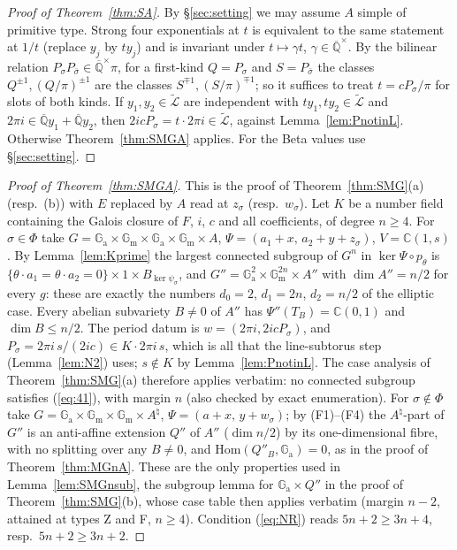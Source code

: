 \documentclass[11pt]{amsart}
\theoremstyle{definition}
\newcommand{\Qb}{\overline{\mathbb{Q}}}
\newcommand{\C}{\mathbb{C}}
\newcommand{\Ga}{\mathbb{G}_{\mathrm a}}
\newcommand{\Gm}{\mathbb{G}_{\mathrm m}}
\newcommand{\Lt}{\widetilde{\mathcal{L}}}
\begin{document}
\begin{proof}[Proof of Theorem~\ref{thm:SA}]
By \S\ref{sec:setting} we may assume $A$ simple of primitive type. Strong four exponentials at $t$ is equivalent to the same
statement at $1/t$ (replace $y_j$ by $ty_j$) and is invariant under $t\mapsto\gamma t$, $\gamma\in\Qb^\times$. By the bilinear
relation $P_\sigma P_{\bar\sigma}\in\Qb^\times\pi$, for a first-kind $Q=P_\sigma$ and $S=P_{\bar\sigma}$ the classes
$Q^{\pm1},(Q/\pi)^{\pm1}$ are the classes $S^{\mp1},(S/\pi)^{\mp1}$; so it suffices to treat $t=cP_\sigma/\pi$ for slots of both
kinds. If $y_1,y_2\in\Lt$ are independent with $ty_1,ty_2\in\Lt$ and $2\pi i\in\Qb y_1+\Qb y_2$, then
$2icP_\sigma=t\cdot2\pi i\in\Lt$, against Lemma~\ref{lem:PnotinL}. Otherwise Theorem~\ref{thm:SMGA} applies. For the Beta
values use \S\ref{sec:setting}.
\end{proof}

\begin{proof}[Proof of Theorem~\ref{thm:SMGA}]
This is the proof of Theorem~\ref{thm:SMG}(a) (resp.\ (b)) with $E$ replaced by $A$ read at $z_\sigma$ (resp.\ $w_\sigma$).
Let $K$ be a number field containing the Galois closure of $F$, $i$, $c$ and all coefficients, of degree $n\ge4$. For
$\sigma\in\Phi$ take $G=\Ga\times\Gm\times\Ga\times\Gm\times A$, $\Psi=(a_1+x,\,a_2+y+z_\sigma)$, $V=\C(1,s)$. By
Lemma~\ref{lem:Kprime} the largest connected subgroup of $G^n$ in $\ker\Psi\circ p_\theta$ is
$\{\theta\cdot a_1=\theta\cdot a_2=0\}\times1\times B_{\ker\psi_\sigma}$, and $G''=\Ga^2\times\Gm^{2n}\times A''$ with
$\dim A''=n/2$ for every $g$: these are exactly the numbers $d_0=2$, $d_1=2n$, $d_2=n/2$ of the elliptic case. Every abelian
subvariety $B\neq0$ of $A''$ has $\Psi''(T_B)=\C(0,1)$ and $\dim B\le n/2$. The period datum is $w=(2\pi i,2icP_\sigma)$, and
$P_\sigma=2\pi i\,s/(2ic)\in K\cdot2\pi i\,s$, which is all that the line-subtorus step (Lemma~\ref{lem:N2}) uses;
$s\notin K$ by Lemma~\ref{lem:PnotinL}. The case analysis of Theorem~\ref{thm:SMG}(a) therefore applies verbatim: no
connected subgroup satisfies (\ref{eq:41}), with margin $n$ (also checked by exact enumeration). For $\sigma\notin\Phi$ take
$G=\Ga\times\Gm\times\Gm\times A^\natural$, $\Psi=(a+x,\,y+w_\sigma)$; by (F1)--(F4) the $A^\natural$-part of $G''$ is an
anti-affine extension $Q''$ of $A''$ ($\dim n/2$) by its one-dimensional fibre, with no splitting over any $B\neq0$, and
$\mathrm{Hom}(Q''_B,\Ga)=0$, as in the proof of Theorem~\ref{thm:MGnA}. These are the only properties used in
Lemma~\ref{lem:SMGnsub}, the subgroup lemma for $\Ga\times Q''$ in the proof of Theorem~\ref{thm:SMG}(b), whose case table
then applies verbatim (margin $n-2$, attained at types Z and F, $n\ge4$). Condition (\ref{eq:NR}) reads $5n+2\ge3n+4$,
resp.\ $5n+2\ge3n+2$.
\end{proof}
\end{document}
